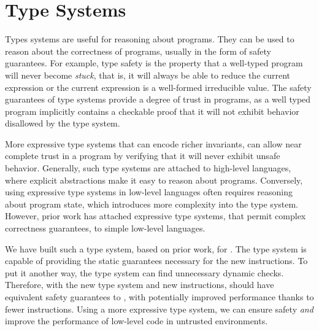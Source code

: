 \section{Type Systems}
Types systems are useful for reasoning about programs.
They can be used to reason about the correctness of programs, usually in the form of safety guarantees.
For example, type safety is the property that a well-typed program will never become \emph{stuck}, that is, it will always be able to reduce the current expression or the current expression is a well-formed irreducible value.
The safety guarantees of type systems provide a degree of trust in programs, as a well typed program implicitly contains a checkable proof that it will not exhibit behavior disallowed by the type system.

More expressive type systems that can encode richer invariants, can allow near complete trust in a program by verifying that it will never exhibit unsafe behavior.
Generally, such type systems are attached to high-level languages, where explicit abstractions make it easy to reason about programs.
Conversely, using expressive type systems in low-level languages often requires reasoning about program state, which introduces more complexity into the type system.
However, prior work has attached expressive type systems, that permit complex correctness guarantees, to simple low-level languages.

We have built such a type system, based on prior work, for \name.
The \name type system is capable of providing the static guarantees necessary for the new \name instructions.
To put it another way, the \name type system can find unnecessary dynamic checks.
Therefore, with the new type system and new instructions, \name should have equivalent safety guarantees to \wasm, with potentially improved performance thanks to fewer instructions.
Using a more expressive type system, we can ensure safety \emph{and} improve the performance of low-level code in untrusted environments.




